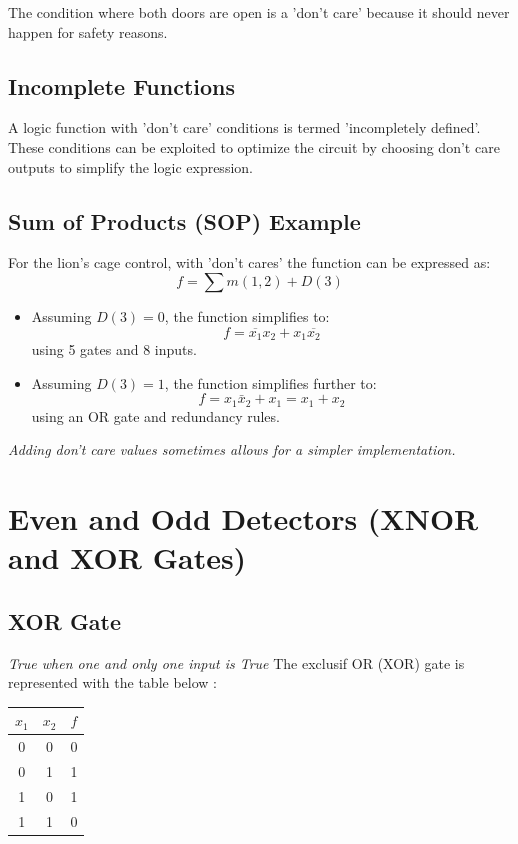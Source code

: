 \documentclass[12pt,openany]{book}
\begin{document}
			      	The condition where both doors are open is a 'don't care' because it should never happen for safety reasons.
			      	
			      	\subsection{Incomplete Functions}
			      	A logic function with 'don't care' conditions is termed 'incompletely defined'. These conditions can be exploited to optimize the circuit by choosing don't care outputs to simplify the logic expression.
			      	
			      	\subsection{Sum of Products (SOP) Example}
			      	For the lion's cage control, with 'don't cares' the function can be expressed as:
			      	\[ f = \sum m(1,2) + D(3) \]
			      	
			      	\begin{itemize}
			      		\item Assuming \( D(3) = 0 \), the function simplifies to:
			      		      \[ f = \overline{x_1} x_2 + x_1 \overline{x_2} \]
			      		      using 5 gates and 8 inputs.
			      		\item Assuming \( D(3) = 1 \), the function simplifies further to:
			      		      \[ f = x_1 \bar{x}_2 + x_1 = x_1 + x_2 \]
			      		      using an OR gate and redundancy rules.
			      	\end{itemize}
			      	
			      	\textit{Adding don't care values sometimes allows for a simpler implementation.}
			      	\section{Even and Odd Detectors (XNOR and XOR Gates)}
			      	\subsection{XOR Gate}
			      	\textit{True when one and only one input is True}
			      	The exclusif OR (XOR) gate is represented with the table below :
			      	\begin{table}[h]
			      		\centering
			      		\begin{tabular}{|c|c|c|}
			      			\hline
			      			\( x_1 \) & \( x_2 \) & \( f \) \\
			      			\hline
			      			0         & 0         & 0       \\
			      			0         & 1         & 1       \\
			      			1         & 0         & 1       \\
			      			1         & 1         & 0       \\
			      			\hline
			      		\end{tabular}
			      	\end{table}
			      	
\end{document}
